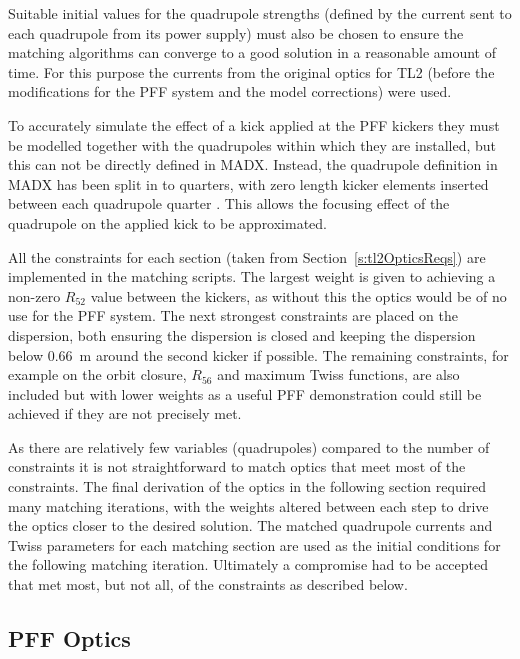 Suitable initial values for the quadrupole strengths (defined by the current sent to each quadrupole from its power supply) must also be chosen to ensure the matching algorithms can converge to a good solution in a reasonable amount of time. For this purpose the currents from the original optics for TL2 (before the modifications for the PFF system and the model corrections) were used. 

To accurately simulate the effect of a kick applied at the PFF kickers they must be modelled together with the quadrupoles within which they are installed, but this can not be directly defined in MADX. Instead, the quadrupole definition in MADX has been split in to quarters, with zero length kicker elements inserted between each quadrupole quarter \cite{piotrPriv}. This allows the focusing effect of the quadrupole on the applied kick to be approximated.

All the constraints for each section (taken from Section~\ref{s:tl2OpticsReqs}) are implemented in the matching scripts. The largest weight is given to achieving a non-zero \(R_{52}\) value between the kickers, as without this the optics would be of no use for the PFF system. The next strongest constraints are placed on the dispersion, both ensuring the dispersion is closed and keeping the dispersion below 0.66~m around the second kicker if possible. The remaining constraints, for example on the orbit closure, \(R_{56}\) and maximum Twiss functions, are also included but with lower weights as a useful PFF demonstration could still be achieved if they are not precisely met.

As there are relatively few variables (quadrupoles) compared to the number of constraints  it is not straightforward to match optics that meet most of the constraints. The final derivation of the optics in the following section required many matching iterations, with the weights altered between each step to drive the optics closer to the desired solution. The matched quadrupole currents and Twiss parameters for each matching section are used as the initial conditions for the following matching iteration. Ultimately a compromise had to be accepted that met most, but not all, of the constraints as described below.

\subsection{PFF Optics}
\label{ss:tl2PFFOptics}

